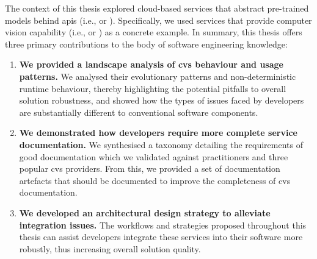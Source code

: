 The context of this thesis explored cloud-based services that abstract pre-trained  models behind \glspl{api} (i.e.,  or ). Specifically, we used services that provide computer vision capability (i.e.,  or ) as a concrete example. In summary, this thesis offers three primary contributions to the body of software engineering knowledge:
\begin{enumerate}[label=\textbf{(\roman*)}]
	\item \textbf{We provided a landscape analysis of \gls{cvs} behaviour and usage patterns.} We analysed their evolutionary patterns and non-deterministic runtime behaviour, thereby highlighting the potential pitfalls to overall solution robustness, and showed how the types of issues faced by developers are substantially different to conventional software components.
	\item \textbf{We demonstrated how developers require more complete service documentation.} We synthesised a taxonomy detailing the requirements of good  documentation which we validated against practitioners and three popular \gls{cvs} providers. From this, we provided a set of documentation artefacts that should be documented to improve the completeness of \gls{cvs} documentation.
	\item \textbf{We developed an architectural design strategy to alleviate integration issues.} The workflows and strategies proposed throughout this thesis can assist developers integrate these services into their software more robustly, thus increasing overall solution quality.
\end{enumerate}
